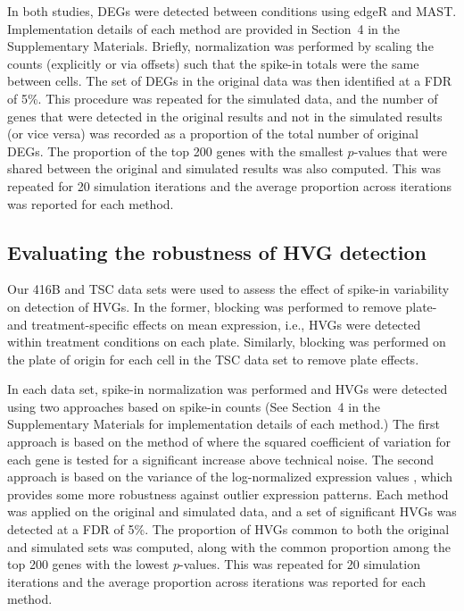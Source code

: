 \documentclass{article}
\newcommand{\suppsecsim}{4}
\begin{document}
In both studies, DEGs were detected between conditions using edgeR and MAST.
Implementation details of each method are provided in Section~\suppsecsim{} in the Supplementary Materials. 
Briefly, normalization was performed by scaling the counts (explicitly or via offsets) such that the spike-in totals were the same between cells.
The set of DEGs in the original data was then identified at a FDR of 5\%.
This procedure was repeated for the simulated data, and the number of genes that were detected in the original results and not in the simulated results (or vice versa) was recorded as a proportion of the total number of original DEGs.
The proportion of the top 200 genes with the smallest $p$-values that were shared between the original and simulated results was also computed.
This was repeated for 20 simulation iterations and the average proportion across iterations was reported for each method.

\subsection*{Evaluating the robustness of HVG detection}
Our 416B and TSC data sets were used to assess the effect of spike-in variability on detection of HVGs.
In the former, blocking was performed to remove plate- and treatment-specific effects on mean expression, i.e., HVGs were detected within treatment conditions on each plate.
Similarly, blocking was performed on the plate of origin for each cell in the TSC data set to remove plate effects.

In each data set, spike-in normalization was performed and HVGs were detected using two approaches based on spike-in counts 
(See Section~\suppsecsim{} in the Supplementary Materials for implementation details of each method.)
The first approach is based on the method of \cite{brennecke2013accounting} where the squared coefficient of variation for each gene is tested for a significant increase above technical noise.
The second approach is based on the variance of the log-normalized expression values \citep{lun2016stepbystep}, which provides some more robustness against outlier expression patterns.
Each method was applied on the original and simulated data, and a set of significant HVGs was detected at a FDR of 5\%.
The proportion of HVGs common to both the original and simulated sets was computed, along with the common proportion among the top 200 genes with the lowest $p$-values.
This was repeated for 20 simulation iterations and the average proportion across iterations was reported for each method.
\end{document}
